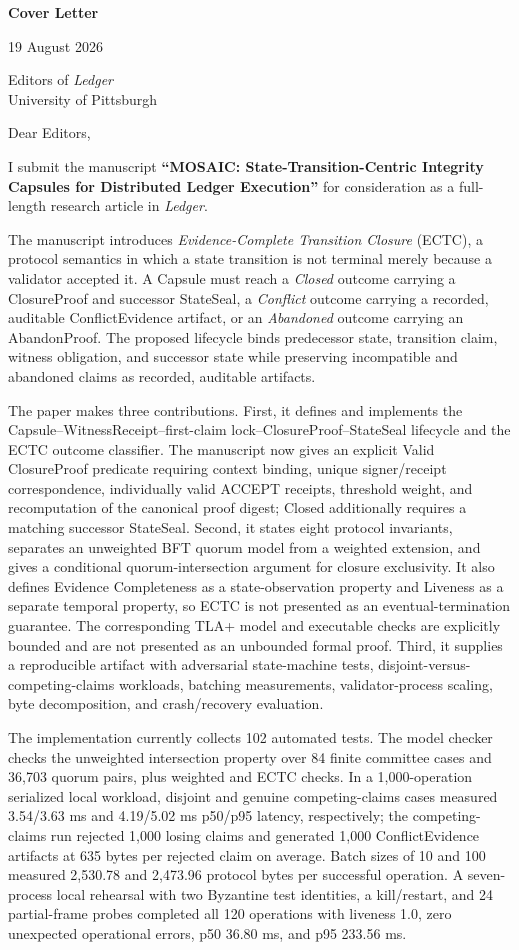 \documentclass[10pt]{article}
\begin{document}
{\Large\bfseries Cover Letter}\par
19 August 2026\par
Editors of \emph{Ledger}\\
University of Pittsburgh

Dear Editors,

I submit the manuscript \textbf{“MOSAIC: State-Transition-Centric Integrity Capsules for Distributed Ledger Execution”} for consideration as a full-length research article in \emph{Ledger}.

The manuscript introduces \emph{Evidence-Complete Transition Closure} (ECTC), a protocol semantics in which a state transition is not terminal merely because a validator accepted it. A Capsule must reach a \emph{Closed} outcome carrying a ClosureProof and successor StateSeal, a \emph{Conflict} outcome carrying a recorded, auditable ConflictEvidence artifact, or an \emph{Abandoned} outcome carrying an AbandonProof. The proposed lifecycle binds predecessor state, transition claim, witness obligation, and successor state while preserving incompatible and abandoned claims as recorded, auditable artifacts.

The paper makes three contributions. First, it defines and implements the Capsule--WitnessReceipt--first-claim lock--ClosureProof--StateSeal lifecycle and the ECTC outcome classifier. The manuscript now gives an explicit Valid ClosureProof predicate requiring context binding, unique signer/receipt correspondence, individually valid ACCEPT receipts, threshold weight, and recomputation of the canonical proof digest; Closed additionally requires a matching successor StateSeal. Second, it states eight protocol invariants, separates an unweighted BFT quorum model from a weighted extension, and gives a conditional quorum-intersection argument for closure exclusivity. It also defines Evidence Completeness as a state-observation property and Liveness as a separate temporal property, so ECTC is not presented as an eventual-termination guarantee. The corresponding TLA+ model and executable checks are explicitly bounded and are not presented as an unbounded formal proof. Third, it supplies a reproducible artifact with adversarial state-machine tests, disjoint-versus-competing-claims workloads, batching measurements, validator-process scaling, byte decomposition, and crash/recovery evaluation.

The implementation currently collects 102 automated tests. The model checker checks the unweighted intersection property over 84 finite committee cases and 36,703 quorum pairs, plus weighted and ECTC checks. In a 1,000-operation serialized local workload, disjoint and genuine competing-claims cases measured 3.54/3.63 ms and 4.19/5.02 ms p50/p95 latency, respectively; the competing-claims run rejected 1,000 losing claims and generated 1,000 ConflictEvidence artifacts at 635 bytes per rejected claim on average. Batch sizes of 10 and 100 measured 2,530.78 and 2,473.96 protocol bytes per successful operation. A seven-process local rehearsal with two Byzantine test identities, a kill/restart, and 24 partial-frame probes completed all 120 operations with liveness 1.0, zero unexpected operational errors, p50 36.80 ms, and p95 233.56 ms.
\end{document}
